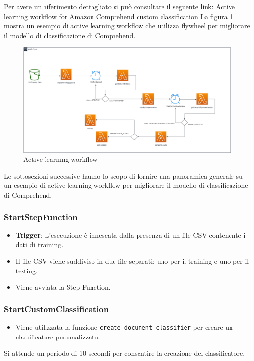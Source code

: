 Per avere un riferimento dettagliato si può consultare il seguente link: \href{https://aws.amazon.com/it/blogs/machine-learning/active-learning-workflow-for-amazon-comprehend-custom-classification-part-1/}{Active learning workflow for Amazon Comprehend custom classification}
La figura \ref{fig:active_learning_workflow} mostra un esempio di active learning workflow che utilizza flywheel per migliorare il modello di classificazione di Comprehend.
\begin{figure}[htbp]
  \centering
  \includegraphics[width=1\textwidth]{img/active_learning_workflow.png}
  \caption{Active learning workflow}
  \label{fig:active_learning_workflow}
\end{figure}
Le sottosezioni successive hanno lo scopo di fornire una panoramica generale su un esempio di active learning workflow per migliorare il modello di classificazione di Comprehend.
\subsubsection{StartStepFunction}
\begin{itemize}
  \item \textbf{Trigger}: L'esecuzione è innescata dalla presenza di un file CSV contenente i dati di training.
  \item Il file CSV viene suddiviso in due file separati: uno per il training e uno per il testing.
  \item Viene avviata la Step Function.
\end{itemize}

\subsubsection{StartCustomClassification}
\begin{itemize}
  \item Viene utilizzata la funzione \texttt{create\_document\_classifier} per creare un classificatore personalizzato.
\end{itemize}
Si attende un periodo di 10 secondi per consentire la creazione del classificatore.

